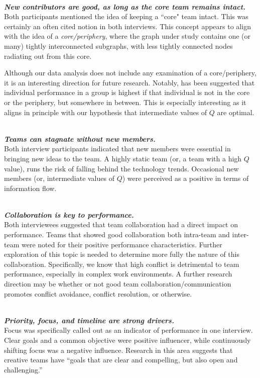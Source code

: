 \documentclass{proc}
\begin{document}
\noindent\\\textit{\textbf{New contributors are good, as long as the core team remains intact.}}\\
Both participants mentioned the idea of keeping a ``core" team intact. This was certainly an often cited notion in both interviews. This concept appears to align with the idea of a \textit{core/periphery}\cite{borgatti2000models}, where the graph under study contains one (or many) tightly interconnected subgraphs, with less tightly connected nodes radiating out from this core.

Although our data analysis does not include any examination of a core/periphery, it is an interesting direction for future research. Notably, has been suggested that individual performance in a group is highest if that individual is not in the core or the periphery, but somewhere in between\cite{cattani2008core}. This is especially interesting as it aligns in principle with our hypothesis that intermediate values of $Q$ are optimal.

\noindent\\\textit{\textbf{Teams can stagnate without new members.}}\\
Both interview participants indicated that new members were essential in bringing new ideas to the team. A highly static team (or, a team with a high $Q$ value), runs the risk of falling behind the technology trends. Occasional new members (or, intermediate values of $Q$) were perceived as a positive in terms of information flow.

\noindent\\\textit{\textbf{Collaboration is key to performance.}}\\
Both interviewees suggested that team collaboration had a direct impact on performance. Teams that showed good collaboration both intra-team and inter-team were noted for their positive performance characteristics. Further exploration of this topic is needed to determine more fully the nature of this collaboration. Specifically, we know that high conflict is detrimental to team performance, especially in complex work environments\cite{de2003task}. A further research direction may be whether or not good team collaboration/communication promotes conflict avoidance, conflict resolution, or otherwise.

\noindent\\\textit{\textbf{Priority, focus, and timeline are strong drivers.}}\\
Focus was specifically called out as an indicator of performance in one interview. Clear goals and a common objective were positive influencer, while continuously shifting focus was a negative influence. Research in this area suggests that creative teams have ``goals that are clear and compelling, but also open and challenging.''\cite{isaksen2002climate}
\end{document}
